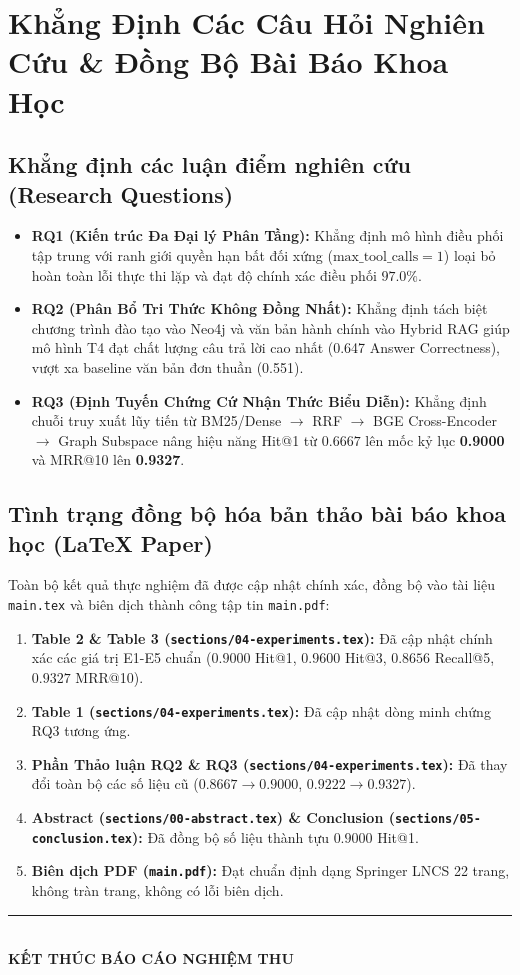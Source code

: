 \documentclass[a4paper,10pt]{article}
\begin{document}
\section{Khẳng Định Các Câu Hỏi Nghiên Cứu \& Đồng Bộ Bài Báo Khoa Học}

\subsection{Khẳng định các luận điểm nghiên cứu (Research Questions)}
\begin{itemize}[itemsep=2pt,leftmargin=1.8em]
    \item \textbf{RQ1 (Kiến trúc Đa Đại lý Phân Tầng):} Khẳng định mô hình điều phối tập trung với ranh giới quyền hạn bất đối xứng ($\text{max\_tool\_calls}=1$) loại bỏ hoàn toàn lỗi thực thi lặp và đạt độ chính xác điều phối $97.0\%$.
    \item \textbf{RQ2 (Phân Bổ Tri Thức Không Đồng Nhất):} Khẳng định tách biệt chương trình đào tạo vào Neo4j và văn bản hành chính vào Hybrid RAG giúp mô hình T4 đạt chất lượng câu trả lời cao nhất (0.647 Answer Correctness), vượt xa baseline văn bản đơn thuần (0.551).
    \item \textbf{RQ3 (Định Tuyến Chứng Cứ Nhận Thức Biểu Diễn):} Khẳng định chuỗi truy xuất lũy tiến từ BM25/Dense $\to$ RRF $\to$ BGE Cross-Encoder $\to$ Graph Subspace nâng hiệu năng Hit@1 từ $0.6667$ lên mốc kỷ lục \textbf{0.9000} và MRR@10 lên \textbf{0.9327}.
\end{itemize}

\subsection{Tình trạng đồng bộ hóa bản thảo bài báo khoa học (LaTeX Paper)}
Toàn bộ kết quả thực nghiệm đã được cập nhật chính xác, đồng bộ vào tài liệu \texttt{main.tex} và biên dịch thành công tập tin \texttt{main.pdf}:
\begin{enumerate}[leftmargin=1.5em,itemsep=1.5pt]
    \item \textbf{Table 2 \& Table 3 (\texttt{sections/04-experiments.tex}):} Đã cập nhật chính xác các giá trị E1-E5 chuẩn ($0.9000$ Hit@1, $0.9600$ Hit@3, $0.8656$ Recall@5, $0.9327$ MRR@10).
    \item \textbf{Table 1 (\texttt{sections/04-experiments.tex}):} Đã cập nhật dòng minh chứng RQ3 tương ứng.
    \item \textbf{Phần Thảo luận RQ2 \& RQ3 (\texttt{sections/04-experiments.tex}):} Đã thay đổi toàn bộ các số liệu cũ ($0.8667 \to 0.9000$, $0.9222 \to 0.9327$).
    \item \textbf{Abstract (\texttt{sections/00-abstract.tex}) \& Conclusion (\texttt{sections/05-conclusion.tex}):} Đã đồng bộ số liệu thành tựu $0.9000$ Hit@1.
    \item \textbf{Biên dịch PDF (\texttt{main.pdf}):} Đạt chuẩn định dạng Springer LNCS 22 trang, không tràn trang, không có lỗi biên dịch.
\end{enumerate}

\vspace{1em}
\begin{center}
    \rule{0.5\textwidth}{0.4pt}\\[0.4em]
    {\small\textbf{KẾT THÚC BÁO CÁO NGHIỆM THU}}
\end{center}
\end{document}
